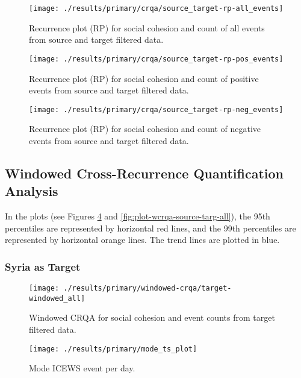 \documentclass[english,man]{apa6}
\begin{document}
\begin{figure}
\texttt{[image: ./results/primary/crqa/source\_target-rp-all\_events]} \caption{Recurrence plot (RP) for social cohesion and count of all events from source and target filtered data.}\label{fig:plot-rp-source-targ-all}
\end{figure}

\begin{figure}
\texttt{[image: ./results/primary/crqa/source\_target-rp-pos\_events]} \caption{Recurrence plot (RP) for social cohesion and count of positive events from source and target filtered data.}\label{fig:plot-rp-source-targ-pos}
\end{figure}

\begin{figure}
\texttt{[image: ./results/primary/crqa/source\_target-rp-neg\_events]} \caption{Recurrence plot (RP) for social cohesion and count of negative events from source and target filtered data.}\label{fig:plot-rp-source-targ-neg}
\end{figure}

\hypertarget{windowed-cross-recurrence-quantification-analysis-1}{%
\subsection{Windowed Cross-Recurrence Quantification Analysis}\label{windowed-cross-recurrence-quantification-analysis-1}}

In the plots (see Figures \ref{fig:plot-wcrqa-targ-all} and
\ref{fig:plot-wcrqa-source-targ-all}), the 95th percentiles are represented
by horizontal red lines, and the 99th percentiles are
represented by horizontal orange lines. The trend lines are plotted in blue.

\hypertarget{syria-as-target-1}{%
\subsubsection{Syria as Target}\label{syria-as-target-1}}

\begin{figure}
\texttt{[image: ./results/primary/windowed-crqa/target-windowed\_all]} \caption{Windowed CRQA for social cohesion and event counts from target filtered data.}\label{fig:plot-wcrqa-targ-all}
\end{figure}

\begin{figure}
\texttt{[image: ./results/primary/mode\_ts\_plot]} \caption{Mode ICEWS event per day.}\label{fig:plot-mode-event}
\end{figure}
\end{document}
